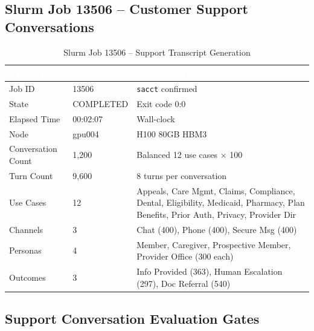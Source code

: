 \documentclass[11pt,a4paper]{article}
\begin{document}
\subsection{Slurm Job 13506 -- Customer Support Conversations}
\begin{table}[H]
\centering
\caption{Slurm Job 13506 -- Support Transcript Generation}
\label{tab:slurm_13506}
\begin{tabular}{>{\color{nvidiaText}}l >{\color{nvidiaText}}l >{\color{nvidiaText}}l}
\rowcolor{tableHeader}
\textcolor{white}{\textbf{Parameter}} & \textcolor{white}{\textbf{Value}} & \textcolor{white}{\textbf{Verification}} \\
\midrule
Job ID & 13506 & \texttt{sacct} confirmed \\
State & COMPLETED & Exit code 0:0 \\
Elapsed Time & 00:02:07 & Wall-clock \\
Node & gpu004 & H100 80GB HBM3 \\
Conversation Count & 1,200 & Balanced 12 use cases $\times$ 100 \\
Turn Count & 9,600 & 8 turns per conversation \\
Use Cases & 12 & Appeals, Care Mgmt, Claims, Compliance, Dental, Eligibility, Medicaid, Pharmacy, Plan Benefits, Prior Auth, Privacy, Provider Dir \\
Channels & 3 & Chat (400), Phone (400), Secure Msg (400) \\
Personas & 4 & Member, Caregiver, Prospective Member, Provider Office (300 each) \\
Outcomes & 3 & Info Provided (363), Human Escalation (297), Doc Referral (540) \\
\bottomrule
\end{tabular}
\end{table}

\subsection{Support Conversation Evaluation Gates}
\begin{figure}[H]
\centering
{}
\end{figure}
\end{document}
